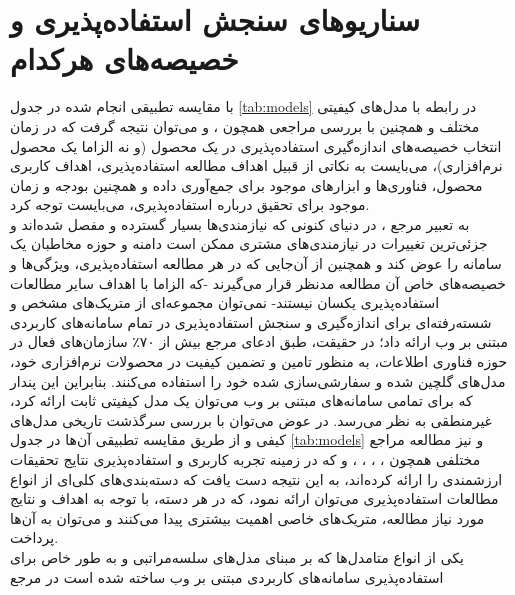 \section{سناریو‌های سنجش استفاده‌پذیری و خصیصه‌های هرکدام}
با مقایسه تطبیقی انجام شده در جدول
\ref{tab:models}
در رابطه با مدل‌های کیفیتی مختلف و همچنین با بررسی مراجعی همچون
\cite{wagner_software_2012}،
\cite{wagner_software_2013} و
\cite{albert_measuring_2013}
می‌توان نتیجه گرفت که در زمان انتخاب خصیصه‌های اندازه‌گیری استفاده‌پذیری در یک محصول (و نه الزاما یک محصول نرم‌افزاری)، می‌بایست به نکاتی از قبیل اهداف مطالعه استفاده‌پذیری، اهداف کاربری محصول، فناوری‌ها و ابزارهای موجود برای جمع‌آوری داده و همچنین بودجه و زمان موجود برای تحقیق درباره استفاده‌پذیری، می‌بایست توجه کرد.\\
به تعبیر مرجع
\cite{albert_measuring_2013}،
در دنیای کنونی که نیازمندی‌ها بسیار گسترده و مفصل شده‌اند و جزئی‌ترین تغییرات در نیازمندی‌های مشتری ممکن است دامنه و حوزه مخاطبان یک سامانه را عوض کند و همچنین از آن‌جایی که در هر مطالعه استفاده‌پذیری، ویژگی‌ها و خصیصه‌های خاص آن مطالعه مدنظر قرار می‌گیرند -که الزاما با اهداف سایر مطالعات استفاده‌پذیری یکسان نیستند- نمی‌توان مجموعه‌ای از متریک‌های مشخص و شسته‌رفته‌ای برای اندازه‌گیری و سنجش استفاده‌پذیری در تمام سامانه‌های کاربردی مبتنی بر وب ارائه داد؛‌
در حقیقت، طبق ادعای مرجع
\cite{wagner_software_2012}
بیش از ۷۰٪ سازمان‌های فعال در حوزه فناوری اطلاعات، به منظور تامین و تضمین کیفیت در محصولات نرم‌افزاری خود، مدل‌های گلچین شده و سفارشی‌سازی شده خود را استفاده می‌کنند. بنابراین این پندار که برای تمامی سامانه‌های مبتنی بر وب می‌توان یک مدل کیفیتی ثابت ارائه کرد، غیرمنطقی به نظر می‌رسد. در عوض می‌توان با بررسی سرگذشت تاریخی مدل‌های کیفی و از طریق مقایسه تطبیقی آن‌ها در جدول
\ref{tab:models}
و نیز مطالعه مراجع مختلفی همچون
\cite{alonso-rios_usability:_2009}،
\cite{bass_linking_2003}،
\cite{bevan_what_1991}،
\cite{pressman_software_2015}،
\cite{sommerville_software_2016}
و
\cite{albert_measuring_2013}
که در زمینه تجربه کاربری و استفاده‌پذیری نتایج تحقیقات ارزشمندی را ارائه کرده‌اند، به این نتیجه دست یافت که دسته‌بندی‌های کلی‌ای از انواع مطالعات استفاده‌پذیری می‌توان ارائه نمود، که در هر دسته، با توجه به اهداف و نتایج مورد نیاز مطالعه، متریک‌های خاصی اهمیت بیشتری پیدا می‌کنند و می‌توان به آن‌ها پرداخت.\\
یکی از انواع متامدل‌ها که بر مبنای مدل‌های سلسه‌مراتبی و به طور خاص برای استفاده‌پذیری سامانه‌های کاربردی مبتنی بر وب ساخته شده است در مرجع
